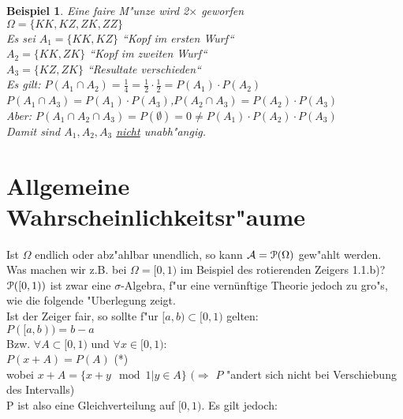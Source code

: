 \documentclass[a4paper,11pt]{book}
\def\AA{ \mathcal{A} }
\def\PM{ \EuScript{P} }
\newtheorem{Bsp}{Beispiel}[chapter]
\theoremstyle{nonumberplain}
\begin{document}
\begin{Bsp}
Eine faire M"unze wird 2$\times$ geworfen\\
$\Omega=\{KK,KZ,ZK,ZZ\}$\\
Es sei $A_1=\{KK,KZ\}$ ``Kopf im ersten Wurf``\\
$A_2=\{KK,ZK\}$ ``Kopf im zweiten Wurf``\\
$A_3=\{KZ,ZK\}$ ``Resultate verschieden``\\
Es gilt: $P(A_1\cap A_2)=\frac{1}{4}=\frac{1}{2}\cdot\frac{1}{2}=P(A_1)\cdot P(A_2)$\\
$P(A_1\cap A_3)=P(A_1)\cdot P(A_3)$,$P(A_2\cap A_3)=P(A_2)\cdot P(A_3)$\\
Aber: $P(A_1\cap A_2\cap A_3)=P(\emptyset)=0\neq P(A_1)\cdot P(A_2)\cdot P(A_3)$\\
Damit sind $A_1,A_2,A_3$ \underline{nicht} unabh"angig.
\end{Bsp}


\chapter{Allgemeine Wahrscheinlichkeitsr"aume}
Ist $\Omega$ endlich oder abz"ahlbar unendlich, so kann $\AA=\PM(\Omega)$ gew"ahlt werden. Was machen wir z.B. bei $\Omega=[0,1)$ im Beispiel des rotierenden Zeigers 1.1.b)?\\
$\PM([0,1))$ ist zwar eine $\sigma$-Algebra, f"ur eine vernünftige Theorie jedoch zu gro"s, wie die folgende "Uberlegung zeigt.\\
Ist der Zeiger fair, so sollte f"ur $[a,b)\subset [0,1)$ gelten:\\
$P([a,b))=b-a$ \\
Bzw. $\forall A\subset[0,1)$ und $\forall x\in [0,1)$:\\
$P(x+A)=P(A)$ (*)\\
wobei $x+A=\{x+y \mod 1|y\in A\}$ $(\Rightarrow$ $P$ "andert sich nicht bei Verschiebung des Intervalls)\\
P ist also eine Gleichverteilung auf $[0,1)$. Es gilt jedoch:\\
\end{document}
